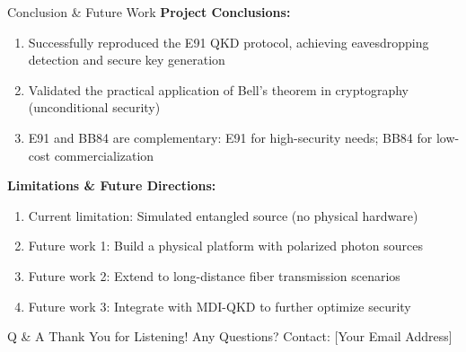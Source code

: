 \documentclass{beamer} %
\begin{document}
\begin{frame}{Conclusion \& Future Work}
    \textbf{Project Conclusions:}
    \begin{enumerate}[<+->]
        \item Successfully reproduced the E91 QKD protocol, achieving eavesdropping detection and secure key generation
        \item Validated the practical application of Bell's theorem in cryptography (unconditional security)
        \item E91 and BB84 are complementary: E91 for high-security needs; BB84 for low-cost commercialization
    \end{enumerate}
    \vspace{1em}
    \textbf{Limitations \& Future Directions:}
    \begin{enumerate}[<+->]
        \item Current limitation: Simulated entangled source (no physical hardware)
        \item Future work 1: Build a physical platform with polarized photon sources
        \item Future work 2: Extend to long-distance fiber transmission scenarios
        \item Future work 3: Integrate with MDI-QKD to further optimize security
    \end{enumerate}
\end{frame}


\begin{frame}{Q \& A}
    \centering
    \Huge{Thank You for Listening!}
    \vspace{2em}
    \Large{Any Questions?}
    \vspace{1em}
    \small{Contact: [Your Email Address]}
\end{frame}

\end{document}

